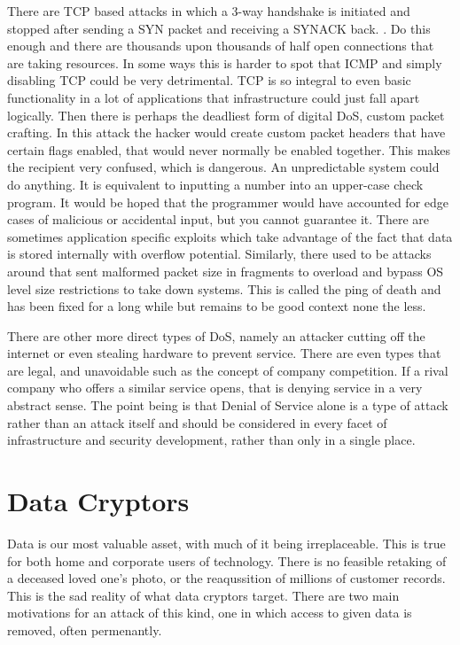 There are TCP based attacks in which a 3-way handshake is initiated and stopped after sending a SYN packet and receiving a SYNACK back. \citep{DoSMit}. 
Do this enough and there are thousands upon thousands of half open connections that are taking resources. In some ways this is harder to spot that ICMP and simply disabling TCP could be very detrimental. TCP is so integral to even basic functionality in a lot of applications that infrastructure could just fall apart logically. \citep{DoSExplained}
Then there is perhaps the deadliest form of digital DoS, custom packet crafting. In this attack the hacker would create custom packet headers that have certain flags enabled, that would never normally be enabled together. This makes the recipient very confused, which is dangerous. An unpredictable system could do anything. It is equivalent to inputting a number into an upper-case check program. 
It would be hoped that the programmer would have accounted for edge cases of malicious or accidental input, but you cannot guarantee it. There are sometimes application specific exploits which take advantage of the fact that data is stored internally with overflow potential. Similarly, there used to be attacks around that sent malformed packet size in fragments to overload and bypass OS level size restrictions to take down systems. 
This is called the ping of death and has been fixed for a long while but remains to be good context none the less. \citep{ICMPFloodDetPrev}

There are other more direct types of DoS, namely an attacker cutting off the internet or even stealing hardware to prevent service. There are even types that are legal, and unavoidable such as the concept of company competition. If a rival company who offers a similar service opens, that is denying service in a very abstract sense.
The point being is that Denial of Service alone is a type of attack rather than an attack itself and should be considered in every facet of infrastructure and security development, rather than only in a single place.
\citep{AssignmentDOSPaper}


\section{Data Cryptors}
Data is our most valuable asset, with much of it being irreplaceable. This is true for both home and corporate users of technology. There is no feasible retaking of a deceased loved one's photo, or the reaqussition of millions of customer records. This is the sad reality of what data cryptors target.
There are two main motivations for an attack of this kind, one in which access to given data is removed, often permenantly. 

